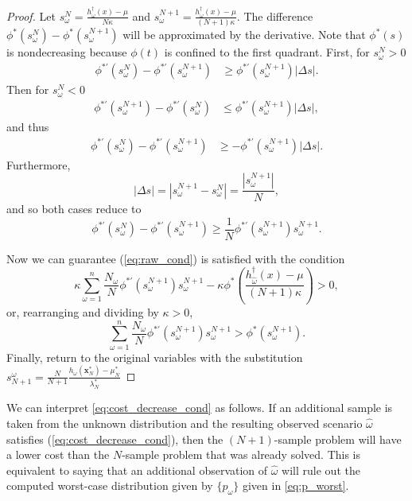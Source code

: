 \documentclass[ijoc,letterpaper]{informs3} %
\newcommand{\x}{\mathbf{x}}
\begin{document}
\begin{proof}
	Let $s^N_\omega = \frac{h^\dagger_\omega(x) - \mu}{N\kappa}$ and $s^{N+1}_\omega = \frac{h^\dagger_\omega(x) - \mu}{(N+1)\kappa}$.
	The difference $\phi^*(s^N_\omega) - \phi^*(s^{N+1}_\omega)$ will be approximated by the derivative.
	Note that $\phi^*(s)$ is nondecreasing because $\phi(t)$ is confined to the first quadrant.
	First, for $s^N_\omega > 0$
	\begin{align*}
		\phi^{*\prime}(s^N_\omega) - \phi^{*\prime}(s^{N+1}_\omega) & \geq \phi^{*\prime}(s^{N+1}_\omega) |\Delta s|.
	\end{align*}
	Then for $s^N_\omega < 0$
	\begin{align*}
		\phi^{*\prime}(s^{N+1}_\omega) - \phi^{*\prime}(s^N_\omega) & \leq \phi^{*\prime}(s^{N+1}_\omega) |\Delta s|,
	\end{align*}
	and thus
	\begin{align*}
		\phi^{*\prime}(s^N_\omega) - \phi^{*\prime}(s^{N+1}_\omega) & \geq -\phi^{*\prime}(s^{N+1}_\omega) |\Delta s|.
	\end{align*}
	Furthermore, 
	\[
		|\Delta s| = | s^{N+1}_\omega - s^N_\omega | = \frac{|s^{N+1}_\omega|}{N},
	\]
	and so both cases reduce to
	\[
		\phi^{*\prime}(s^N_\omega) - \phi^{*\prime}(s^{N+1}_\omega) \geq \frac{1}{N} \phi^{*\prime}(s^{N+1}_\omega) s^{N+1}_\omega.
	\]

	Now we can guarantee (\ref{eq:raw_cond}) is satisfied with the condition
	\[
		\kappa \sum_{\omega=1}^n \frac{N_\omega}{N} \phi^{*\prime}(s^{N+1}_\omega) s^{N+1}_\omega - \kappa \phi^*\left(\frac{h^\dagger_{\hat{\omega}}(x) - \mu}{(N+1)\kappa}\right) > 0,
	\]
	or, rearranging and dividing by $\kappa > 0$,
	\begin{equation} \label{eq:main_value_derivation}
		\sum_{\omega=1}^n \frac{N_\omega}{N} \phi^{*\prime}(s^{N+1}_\omega) s^{N+1}_\omega > \phi^*(s^{N+1}_\omega).
	\end{equation}
	Finally, return to the original variables with the substitution $s^\omega_{N+1} = \frac{N}{N+1} \frac{h_\omega(\x^*_N) - \mu^*_N}{\lambda^*_N}$
\end{proof}

We can interpret \eqref{eq:cost_decrease_cond} as follows. If an additional sample is taken from the unknown distribution and the resulting observed scenario $\hat{\omega}$ satisfies (\ref{eq:cost_decrease_cond}), then the $(N+1)$-sample problem will have a lower cost than the $N$-sample problem that was already solved.
This is equivalent to saying that an additional observation of $\hat{\omega}$ will rule out the computed worst-case distribution given by $\{p_\omega\}$ given in \eqref{eq:p_worst}.
\end{document}
